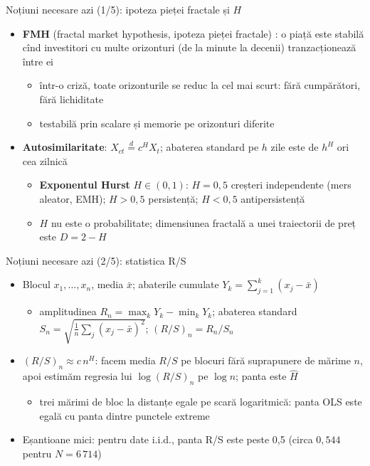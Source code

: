 \begin{frame}{Noțiuni necesare azi (1/5): ipoteza pieței fractale și $H$}
\itemsize{\small}
\begin{itemize}
    \item \textbf{FMH} (fractal market hypothesis, ipoteza pieței fractale) : o piață este stabilă cînd investitori cu multe orizonturi (de la minute la decenii) tranzacționează între ei
    \begin{itemize}
        \item într-o criză, toate orizonturile se reduc la cel mai scurt: fără cumpărători, fără lichiditate
        \item testabilă prin scalare și memorie pe orizonturi diferite
    \end{itemize}
    \item \textbf{Autosimilaritate}: $X_{ct} \overset{d}{=} c^H X_t$; abaterea standard pe $h$ zile este de $h^H$ ori cea zilnică
    \begin{itemize}
        \item \textbf{Exponentul Hurst} $H \in (0, 1)$: $H = 0{,}5$ creșteri independente (mers aleator, EMH); $H > 0{,}5$ persistență; $H < 0{,}5$ antipersistență
        \item $H$ nu este o probabilitate; dimensiunea fractală a unei traiectorii de preț este $D = 2 - H$
    \end{itemize}
\end{itemize}
\end{frame}

\begin{frame}{Noțiuni necesare azi (2/5): statistica R/S}
\itemsize{\small}
\begin{itemize}
    \item Blocul $x_1, \dots, x_n$, media $\bar x$; abaterile cumulate $Y_k = \sum_{j=1}^{k}(x_j - \bar x)$
    \begin{itemize}
        \item amplitudinea $R_n = \max_k Y_k - \min_k Y_k$; abaterea standard $S_n = \sqrt{\tfrac1n\sum_j(x_j - \bar x)^2}$; $(R/S)_n = R_n/S_n$ 
    \end{itemize}
    \item $(R/S)_n \approx c\,n^H$: facem media $R/S$ pe blocuri fără suprapunere de mărime $n$, apoi estimăm regresia lui $\log(R/S)_n$ pe $\log n$; panta este $\hat H$
    \begin{itemize}
        \item trei mărimi de bloc la distanțe egale pe scară logaritmică: panta OLS este egală cu panta dintre punctele extreme
    \end{itemize}
    \item Eșantioane mici: pentru date i.i.d., panta R/S este peste 0,5 (circa $0{,}544$ pentru $N = 6\,714$) 
\end{itemize}
\end{frame}

